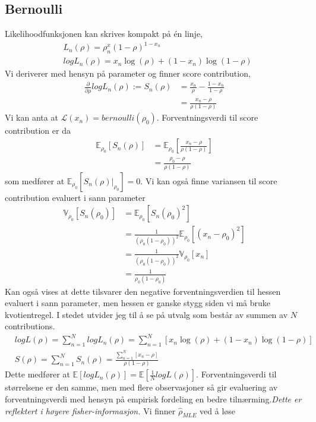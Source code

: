 \subsection{Bernoulli}
Likelihoodfunksjonen kan skrives kompakt på én linje,
\begin{align}
&L_n(\rho) = \rho^x_n(1-\rho)^{1-x_n}\\
&logL_n(\rho) = x_n \log(\rho) + (1-x_n)\log(1-\rho)
\end{align}
Vi deriverer med hensyn på parameter og finner score contribution,
\begin{align}
\frac{\partial}{\partial \rho}logL_n(\rho):=S_n(\rho) &= \frac{x_n}{\rho}-\frac{1-x_n}{1-\rho} \\
&= \frac{x_n-\rho}{\rho(1-\rho)}
\end{align}
Vi kan anta at $\mathcal{L}(x_n) = bernoulli(\rho_0)$. Forventningsverdi til score contribution er da
\begin{align}
\mathbb{E}_{\rho_0}\left[S_n(\rho)\right] &= \mathbb{E}_{\rho_0}\left[\frac{x_n-\rho}{\rho(1-\rho)}\right] \\
&=\frac{\rho_0-\rho}{\rho(1-\rho)}
\end{align}
som medfører at $\mathbb{E}_{\rho_0}[S_n(\rho)|_{\rho_0}] = 0$. Vi kan også finne variansen til score contribution evaluert i sann parameter
\begin{align}
\mathbb{V}_{\rho_0}\left[S_n(\rho_0)\right] &= \mathbb{E}_{\rho_0}\left[S_n(\rho_0)^2\right] \\
&= \frac{1}{(\rho_0(1-\rho_0))^2}\mathbb{E}_{\rho_0}\left[(x_n-\rho_0)^2\right] \\
&=\frac{1}{(\rho_0(1-\rho_0))^2}\mathbb{V}_{\rho_0}[x_n] \\
&=\frac{1}{\rho_0(1-\rho_0)}
\end{align}
Kan også vises at dette tilsvarer den negative forventningsverdien til hessen evaluert i sann parameter, men hessen er ganske stygg siden vi må bruke kvotientregel. I stedet utvider jeg til å se på utvalg som består av summen av $N$ contributions.
\begin{align}
&logL(\rho) = \sum_{n=1}^N logL_n(\rho) = \sum_{n=1}^N \left[x_n \log(\rho) + (1-x_n)\log(1-\rho)\right]  \\
&S(\rho) = \sum_{n=1}^N S_n(\rho) = \frac{\sum_{n=1}^N\left[x_n-\rho\right]}{\rho(1-\rho)}
\end{align}
Dette medfører at $\mathbb{E}[logL_n(\rho)] = \mathbb{E}[\frac{1}{N}logL(\rho)]$. Forventningsverdi til størrelsene er den samme, men med flere observasjoner så gir evaluering av forventningsverdi med hensyn på empirisk fordeling en bedre tilnærming.\textit{Dette er reflektert i høyere fisher-informasjon.} Vi finner $\hat{\rho}_{MLE}$ ved å løse 

